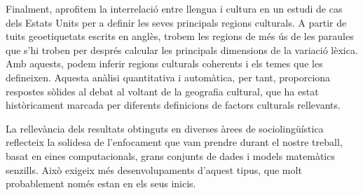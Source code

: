 \documentclass[../thesis.tex]{subfiles}
\begin{document}
\begin{otherlanguage}{catalan}
Finalment, aprofitem la interrelació entre llengua i cultura en un estudi de cas dels
Estats Units per a definir les seves principals regions culturals. A partir de tuits
geoetiquetats escrits en anglès, trobem les regions de més ús de les paraules que s'hi troben
per després calcular les principals dimensions de la variació lèxica. Amb aquests,
podem inferir regions culturals coherents i els temes que les defineixen. Aquesta
anàlisi quantitativa i automàtica, per tant, proporciona respostes sòlides al debat al
voltant de la geografia cultural, que ha estat històricament marcada per diferents
definicions de factors culturals rellevants.

La rellevància dels resultats obtinguts en diverses àrees de sociolingüística reflecteix la solidesa de l'enfocament que vam prendre durant el nostre treball, basat
en eines computacionals, grans conjunts de dades i models matemàtics senzills. Això exigeix
més desenvolupaments d'aquest tipus, que molt probablement només estan en els seus inicis.
\end{otherlanguage}

\endgroup

\vfill
\end{document}

